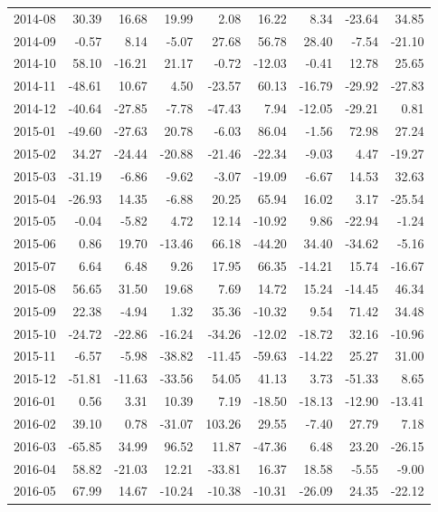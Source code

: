 \begin{table}[ht]
\begin{tabular}{lrrrrrrrr}
  2014-08 & 30.39 & 16.68 & 19.99 & 2.08 & 16.22 & 8.34 & -23.64 & 34.85 \\ 
  2014-09 & -0.57 & 8.14 & -5.07 & 27.68 & 56.78 & 28.40 & -7.54 & -21.10 \\ 
  2014-10 & 58.10 & -16.21 & 21.17 & -0.72 & -12.03 & -0.41 & 12.78 & 25.65 \\ 
  2014-11 & -48.61 & 10.67 & 4.50 & -23.57 & 60.13 & -16.79 & -29.92 & -27.83 \\ 
  2014-12 & -40.64 & -27.85 & -7.78 & -47.43 & 7.94 & -12.05 & -29.21 & 0.81 \\ 
  2015-01 & -49.60 & -27.63 & 20.78 & -6.03 & 86.04 & -1.56 & 72.98 & 27.24 \\ 
  2015-02 & 34.27 & -24.44 & -20.88 & -21.46 & -22.34 & -9.03 & 4.47 & -19.27 \\ 
  2015-03 & -31.19 & -6.86 & -9.62 & -3.07 & -19.09 & -6.67 & 14.53 & 32.63 \\ 
  2015-04 & -26.93 & 14.35 & -6.88 & 20.25 & 65.94 & 16.02 & 3.17 & -25.54 \\ 
  2015-05 & -0.04 & -5.82 & 4.72 & 12.14 & -10.92 & 9.86 & -22.94 & -1.24 \\ 
  2015-06 & 0.86 & 19.70 & -13.46 & 66.18 & -44.20 & 34.40 & -34.62 & -5.16 \\ 
  2015-07 & 6.64 & 6.48 & 9.26 & 17.95 & 66.35 & -14.21 & 15.74 & -16.67 \\ 
  2015-08 & 56.65 & 31.50 & 19.68 & 7.69 & 14.72 & 15.24 & -14.45 & 46.34 \\ 
  2015-09 & 22.38 & -4.94 & 1.32 & 35.36 & -10.32 & 9.54 & 71.42 & 34.48 \\ 
  2015-10 & -24.72 & -22.86 & -16.24 & -34.26 & -12.02 & -18.72 & 32.16 & -10.96 \\ 
  2015-11 & -6.57 & -5.98 & -38.82 & -11.45 & -59.63 & -14.22 & 25.27 & 31.00 \\ 
  2015-12 & -51.81 & -11.63 & -33.56 & 54.05 & 41.13 & 3.73 & -51.33 & 8.65 \\ 
  2016-01 & 0.56 & 3.31 & 10.39 & 7.19 & -18.50 & -18.13 & -12.90 & -13.41 \\ 
  2016-02 & 39.10 & 0.78 & -31.07 & 103.26 & 29.55 & -7.40 & 27.79 & 7.18 \\ 
  2016-03 & -65.85 & 34.99 & 96.52 & 11.87 & -47.36 & 6.48 & 23.20 & -26.15 \\ 
  2016-04 & 58.82 & -21.03 & 12.21 & -33.81 & 16.37 & 18.58 & -5.55 & -9.00 \\ 
  2016-05 & 67.99 & 14.67 & -10.24 & -10.38 & -10.31 & -26.09 & 24.35 & -22.12 \\ 

\end{tabular}
\end{table}
